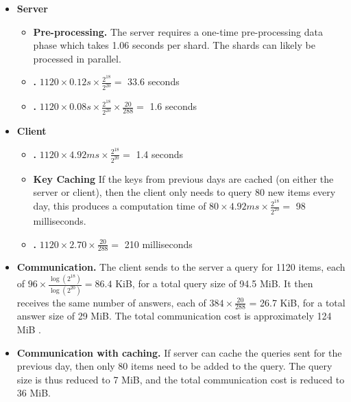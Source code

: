{	\begin{itemize}
		\item \textbf{Server}
		\begin{itemize}
			\item \textbf{Pre-processing.} The server requires a one-time pre-processing data phase which takes 1.06 seconds per shard. The shards can likely be processed in parallel.
			
			
			\item \textbf{\pirexpand.} $1120 \times 0.12 s \times \frac{2^{18}}{2^{20}} =$ 33.6 seconds
			
			\item \textbf{\pirans.} $1120 \times 0.08 s \times \frac{2^{18}}{2^{20}} \times \frac{20}{288} =$ 1.6 seconds
		\end{itemize}
		\item \textbf{Client}
		\begin{itemize}
			\item \textbf{\pirqe.} $1120 \times 4.92 ms \times \frac{2^{18}}{2^{20}} =$ 1.4 seconds
			
			
			\item \textbf{Key Caching} If the keys from previous days are cached (on either the server or client), then the client only needs to query 80 new items every day, this produces a computation time of $80 \times 4.92 ms \times \frac{2^{18}}{2^{20}} =$ 98 milliseconds.
			
			
			\item \textbf{\pirextract.} $1120 \times 2.70 \times \frac{20}{288} = $ 210 milliseconds
		\end{itemize}
		
		\item \textbf{Communication.} The client sends to the server a query for 1120 items, each of $96 \times \frac{\log(2^{18})}{\log(2^{20})}=86.4$ KiB, for a total query size of 94.5 MiB. It then receives the same number of answers, each of $384 \times \frac{20}{288}$ = 26.7 KiB, for a total answer size of 29 MiB. The total communication cost is approximately 124 MiB
		.
		\item \textbf{Communication with caching.} If server can cache the queries sent for the previous day, then only 80 items need to be added to the query. The query size is thus reduced to 7 MiB, and the total communication cost is reduced to 36 MiB.
		
	\end{itemize}
	
}
